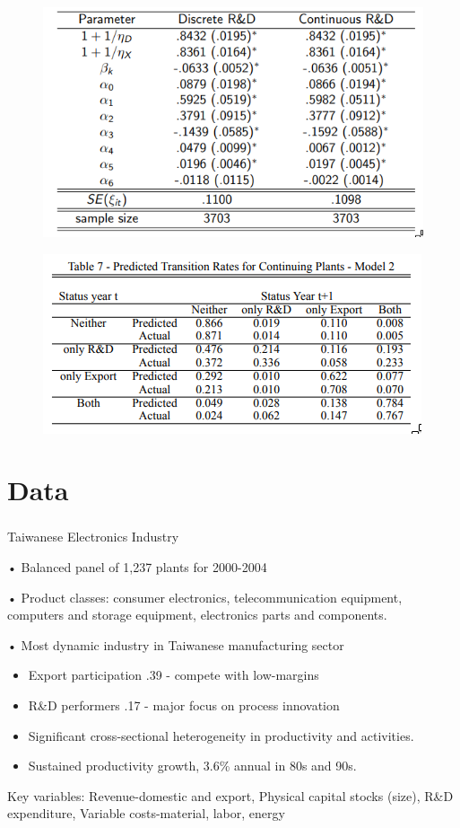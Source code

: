 \documentclass[c, dvipsnames]{beamer}  %
\begin{document}
\begin{frame}[shrink=3]
\frametitle{\insertsection} 

\begin{figure}
	\centering
	\includegraphics[width=0.7\linewidth]{screenshot007}
	\label{fig:screenshot007}
\end{figure}

\begin{figure}
	\centering
	\includegraphics[width=0.7\linewidth]{screenshot009}
	\label{fig:screenshot009}
\end{figure}


\end{frame}


\section{Data}

\begin{frame}[shrink=3]
\frametitle{\insertsection} 

Taiwanese Electronics Industry

• Balanced panel of 1,237 plants for 2000-2004


• Product classes: consumer electronics, telecommunication
equipment, computers and storage equipment, electronics parts and
components.

• Most dynamic industry in Taiwanese manufacturing sector
\begin{itemize}
	\item   Export participation .39 - compete with low-margins
	\item  R\&D performers .17 - major focus on process innovation
	\item  Significant cross-sectional heterogeneity in productivity and
	activities.
	\item  Sustained productivity growth, 3.6\% annual in 80s and 90s.
	
\end{itemize}

Key variables: Revenue-domestic and export, Physical capital stocks
(size), R\&D expenditure, Variable costs-material, labor, energy


\end{frame}
\end{document}

